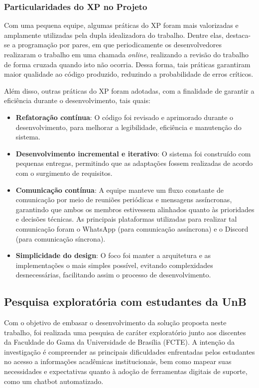 \subsubsection{Particularidades do XP no Projeto}
Com uma pequena equipe, algumas práticas do XP foram mais valorizadas e amplamente utilizadas pela dupla idealizadora do trabalho. Dentre elas, destaca-se a programação por pares, em que periodicamente os desenvolvedores realizaram o trabalho em uma chamada \textit{online}, realizando a revisão do trabalho de forma cruzada quando isto não ocorria. Dessa forma, tais práticas garantiram maior qualidade ao código produzido, reduzindo a probabilidade de erros críticos.

Além disso, outras práticas do XP foram adotadas, com a finalidade de garantir a eficiência durante o desenvolvimento, tais quais:

\begin{itemize}
    \item \textbf{Refatoração contínua}: O código foi revisado e aprimorado durante o desenvolvimento, para melhorar a legibilidade, eficiência e manutenção do sistema.
    \item \textbf{Desenvolvimento incremental e iterativo}: O sistema foi construído com pequenas entregas, permitindo que as adaptações fossem realizadas de acordo com o surgimento de requisitos.
    \item \textbf{Comunicação contínua}: A equipe manteve um fluxo constante de comunicação por meio de reuniões periódicas e mensagens assíncronas, garantindo que ambos os membros estivessem alinhados quanto às prioridades e decisões técnicas. As principais plataformas utilizadas para realizar tal comunicação foram o WhatsApp (para comunicação assíncrona) e o Discord (para comunicação síncrona).
    \item \textbf{Simplicidade do design}: O foco foi manter a arquitetura e as implementações o mais simples possível, evitando complexidades desnecessárias, facilitando assim o processo de desenvolvimento.
\end{itemize}

\subsection{Pesquisa exploratória com estudantes da UnB}

Com o objetivo de embasar o desenvolvimento da solução proposta neste trabalho, foi realizada uma pesquisa de caráter exploratório junto aos discentes da Faculdade do Gama da Universidade de Brasília (FCTE). A intenção da investigação é compreender as principais dificuldades enfrentadas pelos estudantes no acesso a informações acadêmicas institucionais, bem como mapear suas necessidades e expectativas quanto à adoção de ferramentas digitais de suporte, como um chatbot automatizado.

